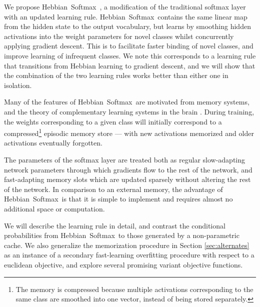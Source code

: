 \documentclass{article} \usepackage{hyperref}
\newcommand{\model}{\hbox{Hebbian Softmax }}
\begin{document}
We propose \model \!, a modification of the traditional softmax layer with an updated learning rule. \model contains the same linear map from the hidden state to the output vocabulary, but learns by smoothing hidden activations into the weight parameters for novel classes whilst concurrently applying gradient descent. This is to facilitate faster binding of novel classes, and improve learning of infrequent classes. We note this corresponds to a learning rule that transitions from Hebbian learning to gradient descent, and we will show that the combination of the two learning rules works better than either one in isolation.

Many of the features of \model are motivated from memory systems, and the theory of complementary learning systems in the brain \cite{mcclelland1995there}. During training, the weights corresponding to a given class will initially correspond to a compressed\footnote{The memory is compressed because multiple activations corresponding to the same class are smoothed into one vector, instead of being stored separately.} episodic memory store --- with new activations memorized and older activations eventually forgotten. 

The parameters of the softmax layer are treated both as regular slow-adapting network parameters through which gradients flow to the rest of the network, and fast-adapting memory slots which are updated sparsely without altering the rest of the network. In comparison to an external memory, the advantage of \model is that it is simple to implement and requires almost no additional space or computation.

We will describe the learning rule in detail, and contrast the conditional probabilities from \model to those generated by a non-parametric cache. We also generalize the memorization procedure in Section \ref{sec:alternates} as an instance of a secondary fast-learning overfitting procedure with respect to a euclidean objective, and explore several promising variant objective functions. 
\end{document}

